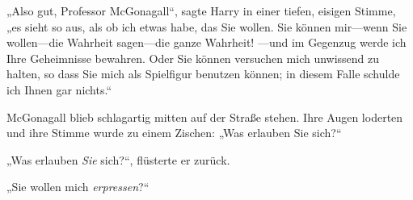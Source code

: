 „Also gut, Professor McGonagall“, sagte Harry in einer tiefen, eisigen Stimme, „es sieht so aus, als ob ich etwas habe, das Sie wollen. Sie können mir—wenn Sie wollen—die Wahrheit sagen—die ganze Wahrheit! —und im Gegenzug werde ich Ihre Geheimnisse bewahren. Oder Sie können versuchen mich unwissend zu halten, so dass Sie mich als Spielfigur benutzen können; in diesem Falle schulde ich Ihnen gar nichts.“

McGonagall blieb schlagartig mitten auf der Straße stehen. Ihre Augen loderten und ihre Stimme wurde zu einem Zischen: „Was erlauben Sie sich?“

„Was erlauben \emph{Sie} sich?“, flüsterte er zurück.

„Sie wollen mich \emph{erpressen}?“


